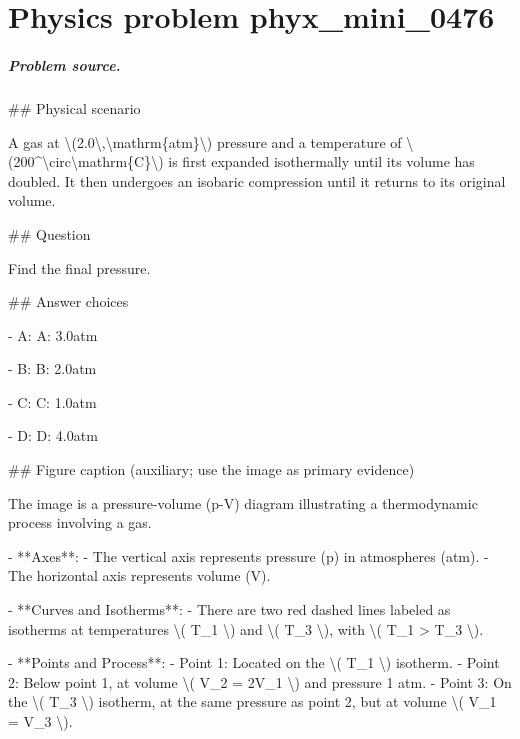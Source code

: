 
\chapter{Physics problem phyx\_mini\_0476}
\label{ch:PhyXMiniProblems_problem_phyx_mini_0476}

\paragraph{Problem source.}
\#\# Physical scenario

A gas at \textbackslash{}(2.0\textbackslash{},\textbackslash{}mathrm\{atm\}\textbackslash{}) pressure and a temperature of \textbackslash{}(200\textasciicircum{}\textbackslash{}circ\textbackslash{}mathrm\{C\}\textbackslash{}) is first expanded isothermally until its volume has doubled. It then undergoes an isobaric compression until it returns to its original volume.

\#\# Question

Find the final pressure.

\#\# Answer choices

- A: A: 3.0atm

- B: B: 2.0atm

- C: C: 1.0atm

- D: D: 4.0atm

\#\# Figure caption (auxiliary; use the image as primary evidence)

The image is a pressure-volume (p-V) diagram illustrating a thermodynamic process involving a gas. 

- **Axes**: 
  - The vertical axis represents pressure (p) in atmospheres (atm).
  - The horizontal axis represents volume (V).
  
- **Curves and Isotherms**:
  - There are two red dashed lines labeled as isotherms at temperatures \textbackslash{}( T\_1 \textbackslash{}) and \textbackslash{}( T\_3 \textbackslash{}), with \textbackslash{}( T\_1 > T\_3 \textbackslash{}).
  
- **Points and Process**:
  - Point 1: Located on the \textbackslash{}( T\_1 \textbackslash{}) isotherm.
  - Point 2: Below point 1, at volume \textbackslash{}( V\_2 = 2V\_1 \textbackslash{}) and pressure 1 atm.
  - Point 3: On the \textbackslash{}( T\_3 \textbackslash{}) isotherm, at the same pressure as point 2, but at volume \textbackslash{}( V\_1 = V\_3 \textbackslash{}).

